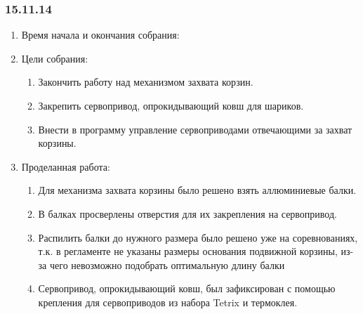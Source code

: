 
\subsubsection{15.11.14}

\begin{enumerate} 
	\item Время начала и окончания собрания:\newline
	
	\item Цели собрания:
	\begin{enumerate}
		\item Закончить работу над механизмом захвата корзин.
		
		\item Закрепить сервопривод, опрокидывающий ковш для шариков.
		
		\item Внести в программу управление сервоприводами отвечающими за захват корзины.
		
	\end{enumerate}
	
	\item Проделанная работа:
	\begin{enumerate}
		\item Для механизма захвата корзины было решено взять аллюминиевые балки. 
		
		\item В балках просверлены отверстия для их закрепления на сервопривод.
		
		\item Распилить балки до нужного размера было решено уже на соревнованиях, т.к. в регламенте не указаны размеры основания подвижной корзины, из-за чего невозможно подобрать оптимальную длину балки 
		
		\item Сервопривод, опрокидывающий ковш, был зафиксирован с помощью крепления для сервоприводов из набора Tetrix и термоклея.
	    \begin{figure}[H]
			\begin{minipage}[h]{0.2\linewidth}
				\center  
			\end{minipage}
			\begin{minipage}[h]{0.6\linewidth}
				\caption{}
			\end{minipage}
		\end{figure}
		

\end{enumerate}
\end{enumerate}
